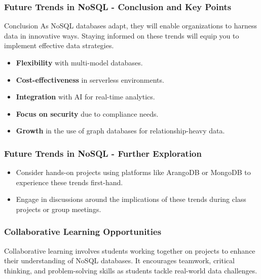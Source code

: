 \documentclass[aspectratio=169]{beamer}
\begin{document}
\begin{frame}[fragile]
    \frametitle{Future Trends in NoSQL - Conclusion and Key Points}
    \begin{block}{Conclusion}
        As NoSQL databases adapt, they will enable organizations to harness data in innovative ways. Staying informed on these trends will equip you to implement effective data strategies.
    \end{block}

    \begin{itemize}
        \item \textbf{Flexibility} with multi-model databases.
        \item \textbf{Cost-effectiveness} in serverless environments.
        \item \textbf{Integration} with AI for real-time analytics.
        \item \textbf{Focus on security} due to compliance needs.
        \item \textbf{Growth} in the use of graph databases for relationship-heavy data.
    \end{itemize}
\end{frame}

\begin{frame}[fragile]
    \frametitle{Future Trends in NoSQL - Further Exploration}
    \begin{itemize}
        \item Consider hands-on projects using platforms like ArangoDB or MongoDB to experience these trends first-hand.
        \item Engage in discussions around the implications of these trends during class projects or group meetings.
    \end{itemize}
\end{frame}

\begin{frame}[fragile]
    \frametitle{Collaborative Learning Opportunities}
    Collaborative learning involves students working together on projects to enhance their understanding of NoSQL databases. 
    It encourages teamwork, critical thinking, and problem-solving skills as students tackle real-world data challenges.
\end{frame}
\end{document}
